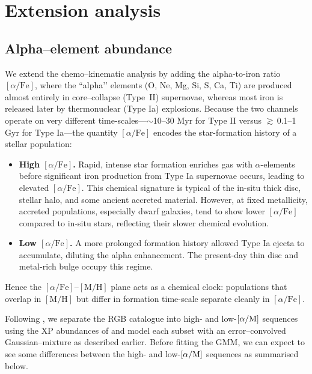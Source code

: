 \documentclass[a4paper,12pt]{article}
\begin{document}
\section{Extension analysis}
\subsection{Alpha–element abundance}\label{subsec:alpha}

We extend the chemo–kinematic analysis by adding the
alpha-to-iron ratio $[\alpha/\mathrm{Fe}]$, where the “alpha’’ elements
(O, Ne, Mg, Si, S, Ca, Ti) are produced almost entirely in core–collapse
(\hbox{Type II}) supernovae, whereas most iron is released later by
thermonuclear (Type Ia) explosions.  Because the two channels operate on
very different time-scales—$\sim$10–30 Myr for Type II versus
$\gtrsim$\,0.1–1 Gyr for Type Ia—the quantity $[\alpha/\mathrm{Fe}]$
encodes the star-formation history of a stellar population:

\begin{itemize}
  \item \textbf{High $[\alpha/\mathrm{Fe}]$.}  
      Rapid, intense star formation enriches gas with $\alpha$-elements 
      before significant iron production from Type Ia supernovae occurs, 
      leading to elevated $[\alpha/\mathrm{Fe}]$. This chemical signature is typical 
      of the in-situ thick disc, stellar halo, and some ancient accreted material. 
      However, at fixed metallicity, accreted populations, especially dwarf galaxies,
       tend to show lower $[\alpha/\mathrm{Fe}]$ 
      compared to in-situ stars, reflecting their slower chemical evolution.


  \item \textbf{Low $[\alpha/\mathrm{Fe}]$.}  
        A more prolonged formation history allowed Type Ia ejecta to
        accumulate, diluting the alpha enhancement.  The present-day thin
        disc and metal-rich bulge occupy this regime.
\end{itemize}

Hence the $[\alpha/\mathrm{Fe}]$–$[\mathrm{M/H}]$ plane acts as a chemical
clock: populations that overlap in $[\mathrm{M/H}]$ but differ in formation
time-scale separate cleanly in $[\alpha/\mathrm{Fe}]$.

Following \citet{Vis2024}, we separate the RGB catalogue into
high- and low-$[\alpha/{\rm M}]$ sequences using the XP abundances of
\citet{Li2024} and model each subset with an error–convolved
Gaussian–mixture as described earlier.  Before fitting the GMM,
we can expect to see some differences between the high- and low-$[\alpha/{\rm M}]$ sequences
as summarised below.  
\end{document}
